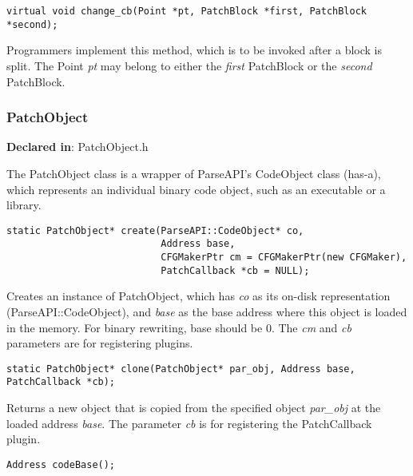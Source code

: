 \begin{verbatim}
virtual void change_cb(Point *pt, PatchBlock *first, PatchBlock *second);

\end{verbatim}



Programmers implement this method, which is to be invoked after a block is
split. The Point \emph{pt} may belong to either the \emph{first} PatchBlock or the
\emph{second} PatchBlock.

\subsubsection{PatchObject}
\label{sec-3.2.8}

\textbf{Declared in}: PatchObject.h

The PatchObject class is a wrapper of ParseAPI's CodeObject class (has-a), which
represents an individual binary code object, such as an executable or a library.


\begin{verbatim}
static PatchObject* create(ParseAPI::CodeObject* co,
                           Address base,
                           CFGMakerPtr cm = CFGMakerPtr(new CFGMaker),
                           PatchCallback *cb = NULL);

\end{verbatim}



Creates an instance of PatchObject, which has \emph{co} as its on-disk representation
(ParseAPI::CodeObject), and \emph{base} as the base address where this object is
loaded in the memory. For binary rewriting, base should be 0. The \emph{cm} and \emph{cb}
parameters are for registering plugins.


\begin{verbatim}
static PatchObject* clone(PatchObject* par_obj, Address base, PatchCallback *cb);

\end{verbatim}



Returns a new object that is copied from the specified object \emph{par\_obj} at the
loaded address \emph{base}. The parameter \emph{cb} is for registering the PatchCallback
plugin.


\begin{verbatim}
Address codeBase();

\end{verbatim}



